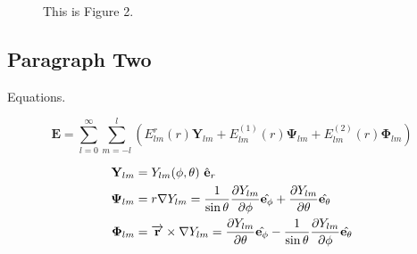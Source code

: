\documentclass[11pt, a4paper]{article}
\numberwithin{equation}{section} %
\begin{document}
\begin{figure}[ht]
	\centering
	\hspace{0in}
	\caption{This is Figure 2.}
\end{figure}

\subsection{Paragraph Two}

Equations.

\begin{equation}
	\mathbf{E}=\sum_{l=0}^{\infty} \sum_{m=-l}^{l}\left(E_{l m}^{r}(r) \mathbf{Y}_{l m}+E_{l m}^{(1)}(r) \mathbf{\Psi}_{l m}+E_{l m}^{(2)}(r) \mathbf{\Phi}_{l m}\right)
\end{equation}

\begin{align}
	\mathbf{Y}_{l m}    & =Y_{l m}(\phi,\theta)\  \hat{\mathbf{e}}_r \\
    \mathbf{\Psi}_{l m} & =r \nabla Y_{l m}=\frac{1}{\sin \theta} \frac{\partial Y_{lm}}{\partial \phi}\hat{\mathbf{e}_{\phi}} + \frac{\partial Y_{lm}}{\partial \theta}\hat{\mathbf{e}_{\theta}} \\
    \notag
    \mathbf{\Phi}_{l m} & =\overrightarrow{\mathbf{r}} \times \nabla Y_{l m}=\frac{\partial Y_{lm}}{\partial \theta}\hat{\mathbf{e}_{\phi}} -\frac{1}{\sin \theta} \frac{\partial Y_{lm}}{\partial \phi}\hat{\mathbf{e}_{\theta}}
\end{align}
\end{document}
